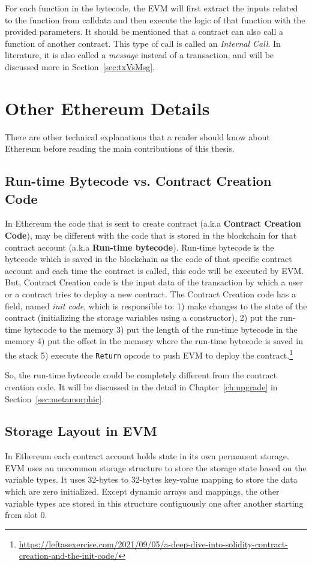 For each function in the bytecode, the EVM will first extract the inputs related to the function from calldata and then execute the logic of that function with the provided parameters. It should be mentioned that a contract can also call a function of another contract. This type of call is called an \emph{Internal Call}. In literature, it is also called a \emph{message} instead of a transaction, and will be discussed more in Section~\ref{sec:txVsMsg}.

\section{Other Ethereum Details}

There are other technical explanations that a reader should know about Ethereum before reading the main contributions of this thesis.

\subsection{Run-time Bytecode vs. Contract Creation Code}
In Ethereum the code that is sent to create contract (a.k.a \textbf{Contract Creation Code}), may be different with the code that is stored in the blockchain for that contract account (a.k.a \textbf{Run-time bytecode}). Run-time bytecode is the bytecode which is saved in the blockchain as the code of that specific contract account and each time the contract is called, this code will be executed by EVM. But, Contract Creation code is the input data of the transaction by which a user or a contract tries to deploy a new contract. The Contract Creation code has a field, named \textit{init code}, which is responsible to: 1) make changes to the state of the contract (initializing the storage variables using a constructor), 2) put the run-time bytecode to the memory 3) put the length of the run-time bytecode in the memory 4) put the offset in the memory where the run-time bytecode is saved in the stack 5) execute the \texttt{Return} opcode to push EVM to deploy the contract.\footnote{\url{https://leftasexercise.com/2021/09/05/a-deep-dive-into-solidity-contract-creation-and-the-init-code/}} 

So, the run-time bytecode could be completely different from the contract creation code. It will be discussed in the detail in Chapter~\ref{ch:upgrade} in Section~\ref{sec:metamorphic}.

\subsection{Storage Layout in EVM} \label{sec:storagelayout}
In Ethereum each contract account holds state in its own permanent storage. EVM uses an uncommon storage structure to store the storage state based on the variable types. It uses 32-bytes to 32-bytes key-value mapping to store the data which are zero initialized. Except dynamic arrays and mappings, the other variable types are stored in this structure contiguously one after another starting from slot 0. 

